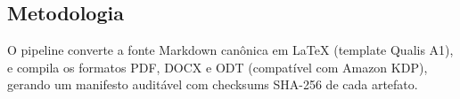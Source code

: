 \hypertarget{metodologia}{%
\subsection{Metodologia}\label{metodologia}}

O pipeline converte a fonte Markdown canônica em LaTeX (template Qualis
A1), e compila os formatos PDF, DOCX e ODT (compatível com Amazon KDP),
gerando um manifesto auditável com checksums SHA-256 de cada artefato.
